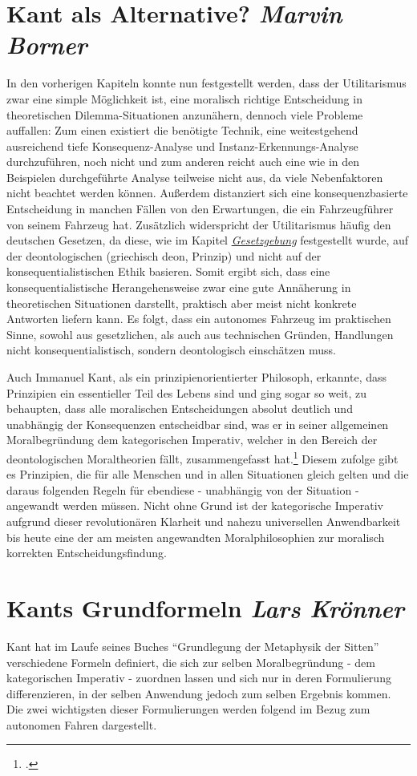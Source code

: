\documentclass[a4paper, 12pt, openany]{book}
\newcommand\Section[2]{\section[#1 {\scriptsize\itshape#2}]{#1 \footnotesize\itshape#2}}
\begin{document}
        \Section{Kant als Alternative?}{Marvin Borner}
            In den vorherigen Kapiteln konnte nun festgestellt werden, dass der Utilitarismus zwar eine simple Möglichkeit ist, eine moralisch richtige Entscheidung in theoretischen Dilemma-Situationen anzunähern, dennoch viele Probleme auffallen: Zum einen existiert die benötigte Technik, eine weitestgehend ausreichend tiefe Konsequenz-Analyse und Instanz-Erkennungs-Analyse durchzuführen, noch nicht und zum anderen reicht auch eine wie in den Beispielen durchgeführte Analyse teilweise nicht aus, da viele Nebenfaktoren nicht beachtet werden können. Außerdem distanziert sich eine konsequenzbasierte Entscheidung in manchen Fällen von den Erwartungen, die ein Fahrzeugführer von seinem Fahrzeug hat. Zusätzlich widerspricht der Utilitarismus häufig den deutschen Gesetzen, da diese, wie im Kapitel \textit{\hyperref[gesetzgebung]{Gesetzgebung}} festgestellt wurde, auf der deontologischen (griechisch deon, Prinzip) und nicht auf der konsequentialistischen Ethik basieren. Somit ergibt sich, dass eine konsequentialistische Herangehensweise zwar eine gute Annäherung in theoretischen Situationen darstellt, praktisch aber meist nicht konkrete Antworten liefern kann. Es folgt, dass ein autonomes Fahrzeug im praktischen Sinne, sowohl aus gesetzlichen, als auch aus technischen Gründen, Handlungen nicht konsequentialistisch, sondern deontologisch einschätzen muss.\par
            Auch Immanuel Kant, als ein prinzipienorientierter Philosoph, erkannte, dass Prinzipien ein essentieller Teil des Lebens sind und ging sogar so weit, zu behaupten, dass alle moralischen Entscheidungen absolut deutlich und unabhängig der Konsequenzen entscheidbar sind, was er in seiner allgemeinen Moralbegründung dem kategorischen Imperativ, welcher in den Bereich der deontologischen Moraltheorien fällt, zusammengefasst hat.\footcite[37]{kirchmann1870grundlegung} Diesem zufolge gibt es Prinzipien, die für alle Menschen und in allen Situationen gleich gelten und die daraus folgenden Regeln für ebendiese - unabhängig von der Situation - angewandt werden müssen. Nicht ohne Grund ist der kategorische Imperativ aufgrund dieser revolutionären Klarheit und nahezu universellen Anwendbarkeit bis heute eine der am meisten angewandten Moralphilosophien zur moralisch korrekten Entscheidungsfindung. %
            
        \Section{Kants Grundformeln}{Lars Krönner}
            Kant hat im Laufe seines Buches \enquote{Grundlegung der Metaphysik der Sitten} verschiedene Formeln definiert, die sich zur selben Moralbegründung - dem kategorischen Imperativ - zuordnen lassen und sich nur in deren Formulierung differenzieren, in der selben Anwendung jedoch zum selben Ergebnis kommen. Die zwei wichtigsten dieser Formulierungen werden folgend im Bezug zum autonomen Fahren dargestellt.
\end{document}
